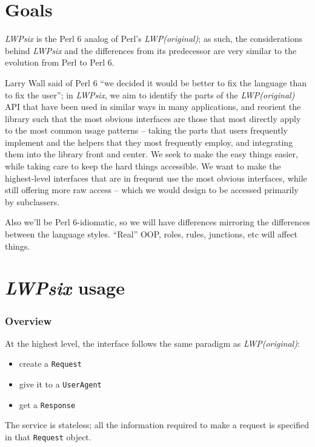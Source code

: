 \documentclass{article}
\newcommand{\LWP}{\emph{LWP(original)}}
\newcommand{\LWPsix}{\emph{LWPsix}}
\begin{document}
\part*{Goals}
    \LWPsix{} is the Perl 6 analog of Perl's \LWP{}; as such, the considerations
    behind \LWPsix{} and the differences from its predecessor are very similar
    to the evolution from Perl to Perl 6.
    
    Larry Wall said of Perl 6 ``we decided it would be better to fix the
    language than to fix the user''; in \LWPsix{}, we aim to identify the parts
    of the \LWP{} API that have been used in similar ways in many applications,
    and reorient the library such that the most obvious interfaces are those
    that most directly apply to the most common usage patterns -- taking the
    parts that users frequently implement and the helpers that they most
    frequently employ, and integrating them into the library front and center.
    We seek to make the easy things easier, while taking care to keep the hard
    things accessible. We want to make the highest-level interfaces that are in
    frequent use the most obvious interfaces, while still offering more raw
    access -- which we would design to be accessed primarily by subclassers.

    Also we'll be Perl 6-idiomatic, so we will have differences mirroring the
    differences between the language styles. ``Real'' OOP, roles, rules,
    junctions, etc will affect things.

\part*{\LWPsix{} usage}
    \section*{Overview}
        At the highest level, the interface follows the same paradigm as \LWP{}:
        \begin{itemize}
            \item create a \texttt{Request}
            \item give it to a \texttt{UserAgent}
            \item get a \texttt{Response}
        \end{itemize}
        The service is stateless; all the information required to make a request is
        specified in that \texttt{Request} object.

\end{document}
